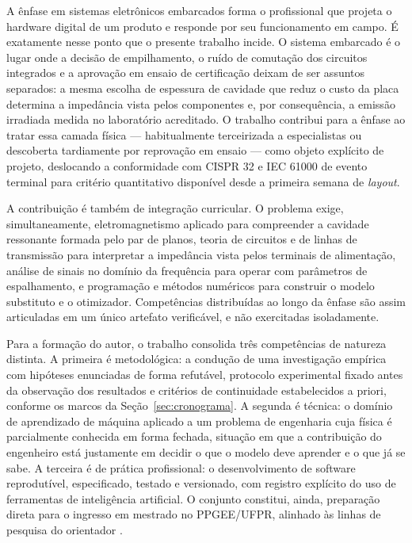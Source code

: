 A ênfase em sistemas eletrônicos embarcados forma o profissional que projeta o
hardware digital de um produto e responde por seu funcionamento em campo. É
exatamente nesse ponto que o presente trabalho incide. O sistema embarcado é o
lugar onde a decisão de empilhamento, o ruído de comutação dos circuitos
integrados e a aprovação em ensaio de certificação deixam de ser assuntos
separados: a mesma escolha de espessura de cavidade que reduz o custo da placa
determina a impedância vista pelos componentes e, por consequência, a emissão
irradiada medida no laboratório acreditado. O trabalho contribui para a ênfase
ao tratar essa camada física — habitualmente terceirizada a especialistas ou
descoberta tardiamente por reprovação em ensaio — como objeto explícito de
projeto, deslocando a conformidade com CISPR 32 e IEC 61000 de evento terminal
para critério quantitativo disponível desde a primeira semana de
\textit{layout}.

A contribuição é também de integração curricular. O problema exige,
simultaneamente, eletromagnetismo aplicado para compreender a cavidade
ressonante formada pelo par de planos, teoria de circuitos e de linhas de
transmissão para interpretar a impedância vista pelos terminais de alimentação,
análise de sinais no domínio da frequência para operar com parâmetros de
espalhamento, e programação e métodos numéricos para construir o modelo
substituto e o otimizador. Competências distribuídas ao longo da ênfase são
assim articuladas em um único artefato verificável, e não exercitadas
isoladamente.

Para a formação do autor, o trabalho consolida três competências de natureza
distinta. A primeira é metodológica: a condução de uma investigação empírica
com hipóteses enunciadas de forma refutável, protocolo experimental fixado
antes da observação dos resultados e critérios de continuidade estabelecidos a
priori, conforme os marcos da Seção~\ref{sec:cronograma}. A segunda é técnica:
o domínio de aprendizado de máquina aplicado a um problema de engenharia cuja
física é parcialmente conhecida em forma fechada, situação em que a
contribuição do engenheiro está justamente em decidir o que o modelo deve
aprender e o que já se sabe. A terceira é de prática profissional: o
desenvolvimento de software reprodutível, especificado, testado e
versionado, com registro explícito do uso de ferramentas de
inteligência artificial. O
conjunto constitui, ainda, preparação direta
para o ingresso em mestrado no PPGEE/UFPR, alinhado às linhas de pesquisa do
orientador \citep{tessaro2026,takara2026,coelho2010}.

